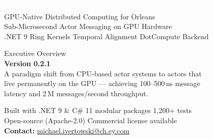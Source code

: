 \documentclass[11pt,a4paper]{article}
\begin{document}
\begin{titlepage}

\vspace*{1.5cm}
\begin{flushleft}
  {\fontsize{34}{40}\selectfont\bfseries\textcolor{white}{Orleans.GpuBridge}}\\[0.5em]
  {\fontsize{16}{20}\selectfont\textcolor{white!85}{GPU-Native Distributed Computing for Orleans}}\\[0.3em]
  {\large\textcolor{white!65}{Sub-Microsecond Actor Messaging on GPU Hardware}}\\[0.3em]
  {\normalsize\textcolor{white!50}{.NET 9 \textbullet{} Ring Kernels \textbullet{} Temporal Alignment \textbullet{} DotCompute Backend}}
\end{flushleft}

\vspace{5.5cm}

\begin{flushleft}
  \textcolor{midgray}{\large Executive Overview}\\[0.8em]
  {\Large\textcolor{brand}{\textbf{Version 0.2.1}}}\\[1.5em]
  \textcolor{midgray}{%
    A paradigm shift from CPU-based actor systems to actors that\\
    live permanently on the GPU --- achieving 100--500\,ns message\\
    latency and 2\,M messages/second throughput.%
  }
\end{flushleft}

\vfill
\begin{flushleft}
  \textcolor{midgray}{\small
    Built with .NET 9 \& C\# \textbullet{} 11 modular packages \textbullet{} 1,200+ tests\\[4pt]
    Open-source (Apache-2.0) \textbullet{} Commercial license available\\[4pt]
    \textbf{Contact:} \href{mailto:michael.ivertowski@ch.ey.com}{michael.ivertowski@ch.ey.com}
  }
\end{flushleft}
\end{titlepage}
\end{document}
